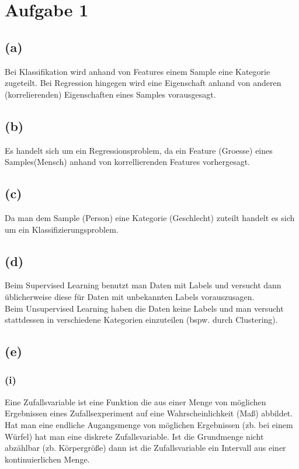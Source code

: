 \documentclass[a4paper]{scrartcl}
\begin{document}
	
	
\section*{Aufgabe 1}
\subsection*{(a)}
Bei Klassifikation wird anhand von Features einem Sample eine Kategorie zugeteilt. Bei Regression hingegen wird eine Eigenschaft anhand von anderen (korrelierenden) Eigenschaften eines Samples vorausgesagt.

\subsection*{(b)}
Es handelt sich um ein Regressionsproblem, da ein Feature (Groesse) eines Samples(Mensch) anhand von korrellierenden Features vorhergesagt.

\subsection*{(c)}
Da man dem Sample (Person) eine Kategorie (Geschlecht) zuteilt handelt es sich um ein Klassifizierungsproblem.


\subsection*{(d)}
Beim Supervised Learning benutzt man Daten mit Labels und versucht dann üblicherweise diese für Daten mit unbekannten Labels vorauszusagen.\\
Beim Unsupervised Learning haben die Daten keine Labels und man versucht stattdessen in verschiedene Kategorien einzuteilen (bspw. durch Clustering).

\subsection*{(e)}
\subsubsection*{(i)}
Eine Zufallsvariable ist eine Funktion die aus einer Menge von möglichen Ergebnissen eines Zufallsexperiment auf eine Wahrscheinlichkeit (Maß) abbildet. Hat man eine endliche Augangsmenge von möglichen Ergebnissen (zb. bei einem Würfel) hat man eine diskrete Zufallsvariable. Ist die Grundmenge nicht abzählbar (zb. Körpergröße) dann ist die Zufallsvariable ein Intervall aus einer kontinuierlichen Menge.
\end{document}
